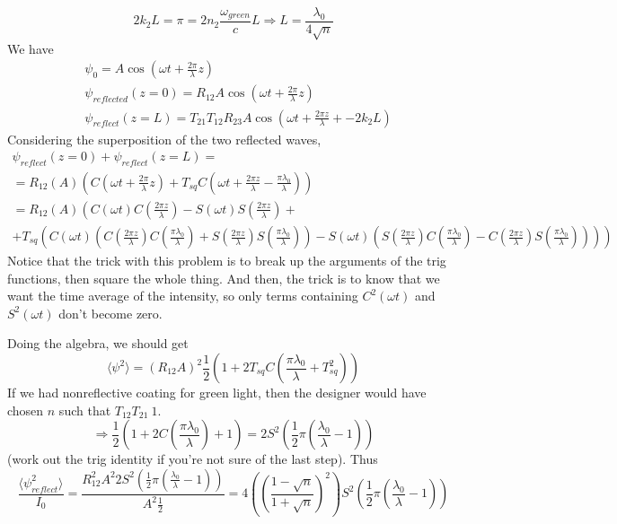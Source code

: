 \documentclass[twoside,10pt]{amsart}
\begin{document}
\[
2 k_2 L = \pi = 2 n_2 \frac{ \omega_{green} }{ c } L \Longrightarrow L = \frac{ \lambda_0}{ 4 \sqrt{n} }
\]
We have
\[
\begin{aligned}
  & \psi_0  = A \cos{ (\omega t + \frac{ 2 \pi }{\lambda} z ) } \\
  & \psi_{reflected}(z=0) = R_{12} A \cos{ (\omega t + \frac{ 2 \pi}{ \lambda} z ) } \\
  & \psi_{reflect}(z=L) = T_{21}T_{12} R_{23} A \cos{ (\omega t + \frac{ 2 \pi z}{ \lambda} + -2k_2 L ) } 
\end{aligned}
\]
Considering the superposition of the two reflected waves,
\[
\begin{gathered}
  \psi_{reflect}(z=0) + \psi_{reflect}(z=L) = \\
  = R_{12} (A) ( C(\omega t + \frac{ 2 \pi }{\lambda} z )  + T_{sq} C(\omega t + \frac{ 2 \pi z}{ \lambda} - \frac{ \pi \lambda_0}{ \lambda} ) ) \\
  = R_{12} (A) \left( C(\omega t) C\left( \frac{ 2 \pi z}{\lambda} \right) - S(\omega t) S\left( \frac{ 2 \pi z}{ \lambda} \right) + \right.  \\
+ \left. T_{sq} \left( C(\omega t) \left( C\left( \frac{ 2 \pi z}{\lambda} \right) C \left( \frac{ \pi \lambda_0 }{ \lambda} \right) + S\left( \frac{ 2 \pi z}{\lambda} \right) S \left( \frac{ \pi \lambda_0 }{ \lambda} \right) \right) - S(\omega t) \left( S\left( \frac{ 2 \pi z}{\lambda} \right) C \left( \frac{ \pi \lambda_0 }{ \lambda} \right) - C\left( \frac{ 2 \pi z}{\lambda} \right) S \left( \frac{ \pi \lambda_0 }{ \lambda} \right) \right) \right) \right)  
\end{gathered}
\]
Notice that the trick with this problem is to break up the arguments of the trig functions, then square the whole thing.  And then, the trick is to know that we want the time average of the intensity, so only terms containing $C^2(\omega t)$ and $S^2(\omega t)$ don't become zero.  

Doing the algebra, we should get
\[
\langle \psi^2 \rangle = (R_{12}A)^2 \frac{1}{2} \left( 1 + 2 T_{sq} C\left( \frac{ \pi \lambda_0 }{ \lambda } + T_{sq}^2 \right) \right)
\]
If we had nonreflective coating for green light, then the designer would have chosen $n$ such that $T_{12}T_{21} ~ 1$.  
\[
\Longrightarrow \frac{1}{2} ( 1 + 2 C\left( \frac{ \pi \lambda_0}{ \lambda} \right) + 1 ) = 2 S^2(\frac{1}{2} \pi \left( \frac{ \lambda_0}{\lambda} - 1 \right) ) 
\]
(work out the trig identity if you're not sure of the last step).  Thus
\[
\frac{ \langle \psi^2_{reflect} \rangle }{ I_0 } = \frac{ R_{12}^2 A^2 2 S^2\left( \frac{1}{2} \pi \left( \frac{ \lambda_0 }{ \lambda} - 1 \right) \right) }{ A^2 \frac{1}{2} } = \boxed{ 4 \left( \left( \frac{ 1 - \sqrt{n }}{ 1 + \sqrt{n}} \right)^2 \right) S^2\left( \frac{1}{2} \pi \left( \frac{\lambda_0}{ \lambda} - 1 \right) \right) } 
\]
\end{document}
